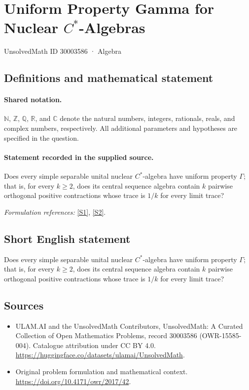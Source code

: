 \documentclass[11pt]{article}
\newcommand{\sref}[2]{\hyperlink{source:#1:#2}{[S#2]}}
\begin{document}
\setcounter{section}{30003585}
\section{\texorpdfstring{Uniform Property Gamma for Nuclear $C^*$-Algebras}{Uniform Property Gamma for Nuclear C\textasciicircum{}*-Algebras}}\label{30003586}
{\small UnsolvedMath ID 30003586 · Algebra}
\subsection{Definitions and mathematical statement}

\paragraph{Shared notation.}$\mathbb N$, $\mathbb Z$, $\mathbb Q$, $\mathbb R$, and $\mathbb C$ denote the natural numbers, integers, rationals, reals, and complex numbers, respectively. All additional parameters and hypotheses are specified in the question.


\paragraph{Statement recorded in the supplied source.}
Does every simple separable unital nuclear $C^*$-algebra have uniform property $\Gamma$; that is, for every $k\geq2$, does its central sequence algebra contain $k$ pairwise orthogonal positive contractions whose trace is $1/k$ for every limit trace?
\par\smallskip\textit{Formulation references:} \sref{30003586}{1}, \sref{30003586}{2}.
\subsection{Short English statement}
Does every simple separable unital nuclear $C^*$-algebra have uniform property $\Gamma$; that is, for every $k\geq2$, does its central sequence algebra contain $k$ pairwise orthogonal positive contractions whose trace is $1/k$ for every limit trace?
\subsection{Sources}
\begin{itemize}
\item[\hypertarget{source:30003586:1}{S1}] ULAM.AI and the UnsolvedMath Contributors, UnsolvedMath: A Curated Collection of Open Mathematics Problems, record 30003586 (OWR-15585-004). Catalogue attribution under CC BY 4.0.
\url{https://huggingface.co/datasets/ulamai/UnsolvedMath}.
\item[\hypertarget{source:30003586:2}{S2}] Original problem formulation and mathematical context.
\url{https://doi.org/10.4171/owr/2017/42}.
\end{itemize}
\label{end:30003586}
\end{document}
